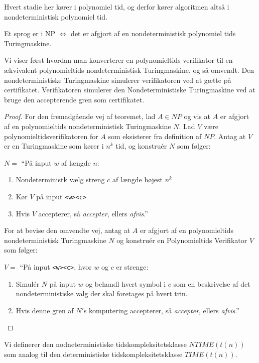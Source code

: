 Hvert stadie her kører i polynomiel tid, og derfor kører algoritmen altså i nondeterministisk polynomiel tid.

\begin{theorem}
	Et sprog er i NP $\iff$ det er afgjort af en nondeterministisk polynomiel tids Turingmaskine.
\end{theorem}

Vi viser først hvordan man konverterer en polynomieltids verifikator til en ækvivalent polynomieltids nondeterministisk Turingmaskine, og så omvendt. Den nondeterministiske Turingmaskine simulerer verifikatoren ved at gætte på certifikatet. Verifikatoren simulerer den Nondeterministiske Turingmaskine ved at bruge den accepterende gren som certifikatet.

\begin{proof}
	For den fremadgående vej af teoremet, lad $A \in NP$ og vis at $A$ er afgjort af en polynomieltids nondeterministisk Turingmaskine $N$. Lad $V$ være polynomieltidsverifikatoren for $A$ som eksisterer fra definition af $NP$. Antag at $V$ er en Turingmaskine som kører i $n^{k}$ tid, og konstruér $N$ som følger:

	$N = $ ``På input $w$ af længde $n$:
	\begin{enumerate}
		\item Nondeterministk vælg streng $c$ af længde højest $n^{k}$
		\item Kør $V$ på input \texttt{<w><c>}
		\item Hvis $V$ accepterer, så \textit{accepter}, ellers \textit{afvis}.''
	\end{enumerate}

	For at bevise den omvendte vej, antag at $A$ er afgjort af en polynomieltids nondeterministisk Turingmaskine $N$ og konstruér en Polynomieltids Verifikator $V$ som følger:

	$V = $ ``På input \texttt{<w><c>}, hvor $w$ og $c$ er strenge:
	\begin{enumerate}
		\item Simulér $N$ på input $w$ og behandl hvert symbol i $c$ som en beskrivelse af det nondeterministiske valg der skal foretages på hvert trin.
		\item Hvis denne gren af $N'$s komputering accepterer, så \textit{accepter}, ellers \textit{afvis}.''
	\end{enumerate}


\end{proof}

Vi definerer den nodneterministiske tidskompleksitetsklasse $NTIME(t(n))$ som analog til den deterministiske tidskompleksitetsklasse $TIME(t(n))$.

